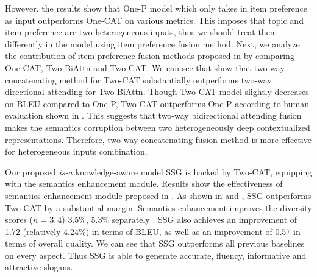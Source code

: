 However, the results show that
One-P model which only takes in item preference as input outperforms
One-CAT on various metrics.
This imposes that topic and item preference are two heterogeneous inputs,
thus we should treat them differently in the model using item preference fusion method.
Next, we analyze the contribution of item preference fusion methods proposed
in 
by comparing One-CAT, Two-BiAttn and Two-CAT.
We can see that show that two-way concatenating method for Two-CAT
substantially outperforms two-way directional attending for Two-BiAttn.
Though Two-CAT model slightly decreases on BLEU compared to One-P,
Two-CAT outperforms One-P according to human evaluation shown in .
This suggests that two-way bidirectional attending fusion 
makes the semantics corruption between two heterogeneously deep contextualized representations.
Therefore, two-way concatenating fusion method is more effective for 
heterogeneous inputs combination.

Our proposed \emph{is-a} knowledge-aware model SSG 
is backed by Two-CAT, equipping with the semantics enhancement module.
Results show the effectiveness of semantics enhancement module
proposed in .
As shown in  and , 
SSG outperforms Two-CAT by a substantial margin.
Semantics enhancement improves the
diversity scores ($n=3, 4$) 3.5\%, 5.3\% separately .
SSG also achieves an improvement of 1.72 (relatively 4.24\%) in terms of BLEU, 
as well as an improvement of 0.57 in terms of overall quality.
We can see that SSG outperforms all previous baselines on every aspect.
Thus SSG is able to generate accurate, fluency, informative and attractive slogans.


%

